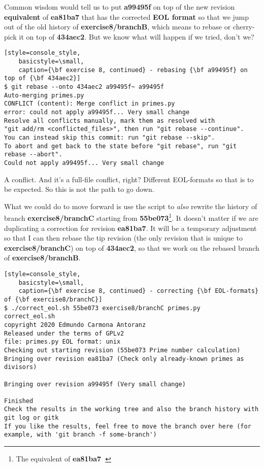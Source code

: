 Common wisdom would tell us to put {\bf a99495f} on top of the new revision {\bf equivalent } of {\bf ea81ba7} that has
the corrected {\bf EOL format} so that we jump out of the old history of {\bf exercise8/branchB}, which means to rebase or
cherry-pick it on top of {\bf 434aec2}. But we know what will happen if we tried, don't we?

\begin{lstlisting}[style=console_style,
	basicstyle=\small,
	caption={\bf exercise 8, continued} - rebasing {\bf a99495f} on top of {\bf 434aec2}]
$ git rebase --onto 434aec2 a99495f~ a99495f
Auto-merging primes.py
CONFLICT (content): Merge conflict in primes.py
error: could not apply a99495f... Very small change
Resolve all conflicts manually, mark them as resolved with
"git add/rm <conflicted_files>", then run "git rebase --continue".
You can instead skip this commit: run "git rebase --skip".
To abort and get back to the state before "git rebase", run "git rebase --abort".
Could not apply a99495f... Very small change
\end{lstlisting}

A conflict. And it's a full-file conflict, right? Different EOL-formats so that is to be expected. So this is not the path to go
down.

What we could do to move forward is use the script to {\it also} rewrite the history of branch {\bf exercise8/branchC} starting from
{\bf 55be073}\footnote{The equivalent of {\bf ea81ba7~}}. It doesn't matter if we are duplicating a correction for revision
{\bf ea81ba7}. It will be a temporary adjustment so that I can then rebase the tip revision (the only revision that is unique to
{\bf exercise8/branchC}) on top of {\bf 434aec2}, so that we work on the rebased branch of {\bf exercise8/branchB}.

\begin{lstlisting}[style=console_style,
	basicstyle=\small,
	caption={\bf exercise 8, continued} - correcting {\bf EOL-formats} of {\bf exercise8/branchC}]
$ ./correct_eol.sh 55be073 exercise8/branchC primes.py
correct_eol.sh
copyright 2020 Edmundo Carmona Antoranz
Released under the terms of GPLv2
file: primes.py EOL format: unix
Checking out starting revision (55be073 Prime number calculation)
Bringing over revision ea81ba7 (Check only already-known primes as divisors)

Bringing over revision a99495f (Very small change)

Finished
Check the results in the working tree and also the branch history with git log or gitk
If you like the results, feel free to move the branch over here (for example, with 'git branch -f some-branch')
\end{lstlisting}

